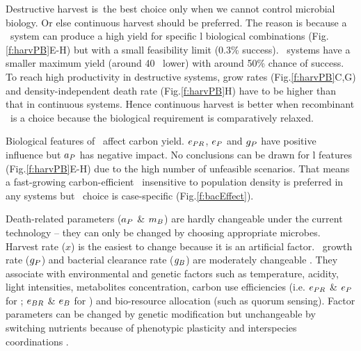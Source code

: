 \documentclass[../thesis.tex]{subfiles} %
\begin{document}
Destructive harvest is\ the best choice only when we cannot control microbial biology.  Or else continuous harvest should be preferred.  The reason is because a \PBH\ system can produce a high yield for specific \bac l biological combinations (Fig.\ref{f:harvPB}E-H) but with a small feasibility limit (0.3\% success).  \PBN\ systems have a smaller maximum yield (around 40 \dxdt\ lower) with around 50\% chance of success.  To reach high productivity in destructive systems, grow rates (Fig.\ref{f:harvPB}C,G) and density-independent death rate (Fig.\ref{f:harvPB}H) have to be higher than that in continuous systems.  Hence continuous harvest is better when recombinant \bac\ is a choice because the biological requirement is comparatively relaxed.

Biological features of \phy\ affect carbon yield.  $e_{PR}$, $e_P$ and $g_P$ have positive influence but $a_P$ has negative impact.  No conclusions can be drawn for \bac l features (Fig.\ref{f:harvPB}E-H) due to the high number of unfeasible scenarios.  That means a fast-growing carbon-efficient \phy\ insensitive to population density is preferred in any systems but \bac\ choice is case-specific (Fig.\ref{f:bacEffect}).

Death-related parameters ($a_P$ \& $m_B$) are hardly changeable under the current technology -- they can only be changed by choosing appropriate microbes.  Harvest rate ($x$) is the easiest to change because it is an artificial factor.  \Phy\ growth rate ($g_P$) and bacterial clearance rate ($g_B$) are moderately changeable \autocite{park2020potential}.  They associate with environmental and genetic factors such as temperature, acidity, light intensities, metabolites concentration, carbon use efficiencies (i.e. $e_{PR}$ \& $e_P$ for \phy; $e_{BR}$ \& $e_B$ for \bac) and bio-resource allocation (such as quorum sensing).  Factor parameters can be changed by genetic modification \autocite{moniruzzaman1996ethanol} but unchangeable by switching nutrients because of phenotypic plasticity \autocite{j1989respiration,bratbak1985phytoplankton,samejima1958heterotrophic} and interspecies coordinations \autocite{beliaev2014inference,amin2012interactions}.
\end{document}
